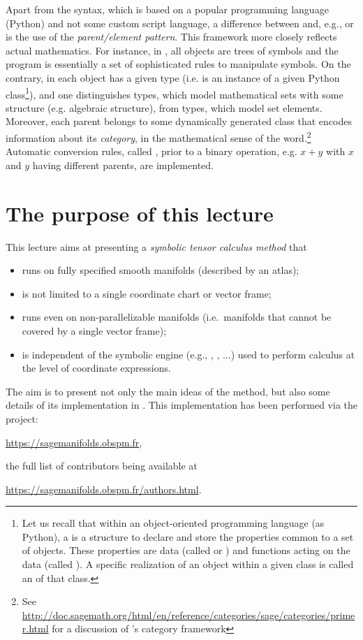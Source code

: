 Apart from the syntax, which is based on a popular programming language
(Python) and not some custom script
language, a difference between \Sage{} and, e.g.,  or 
is the use of the \emph{parent/element pattern}. This framework more closely
reflects actual mathematics.
For instance, in , all objects
are trees of symbols and the program is essentially a set of
sophisticated rules to manipulate symbols. On the contrary, in \Sage{}
each object has a given type (i.e. is an instance of a given
Python class\footnote{Let us
recall that within an object-oriented programming language (as Python),
a  is a structure to declare and store the
properties common to a set of objects. These properties
are data (called
 or ) and functions acting
on the data (called ). A specific realization of an object
within a given class is called an  of that class.}),
and one distinguishes  types, which model mathematical
sets with some structure (e.g. algebraic structure), from  types,
which model set elements. Moreover, each parent belongs to some
dynamically generated class that encodes information
about its \emph{category}, in the mathematical sense of the word.\footnote{See
\url{http://doc.sagemath.org/html/en/reference/categories/sage/categories/primer.html}
for a discussion of \Sage{}'s category framework}
Automatic conversion rules, called ,
prior to a binary operation, e.g. $x+y$ with $x$ and $y$ having different
parents, are implemented.

\section{The purpose of this lecture}

This lecture aims at presenting
a \emph{symbolic tensor calculus method} that
\begin{itemize}
\item runs on fully specified smooth manifolds (described by an atlas);
\item is not limited to a single coordinate chart or vector frame;
\item runs even on non-parallelizable manifolds (i.e.\ manifolds that cannot
be covered by a single vector frame);
\item is independent of the symbolic engine (e.g., ,
, ...) used to perform calculus at the level of coordinate expressions.
\end{itemize}
The aim is to present not only the main ideas of the method, but also some details of its implementation in \Sage{}. This implementation has been
performed via the  project:
\begin{center}
\url{https://sagemanifolds.obspm.fr},
\end{center}
the full list of contributors being available at
\begin{center}
\url{https://sagemanifolds.obspm.fr/authors.html}.
\end{center}
